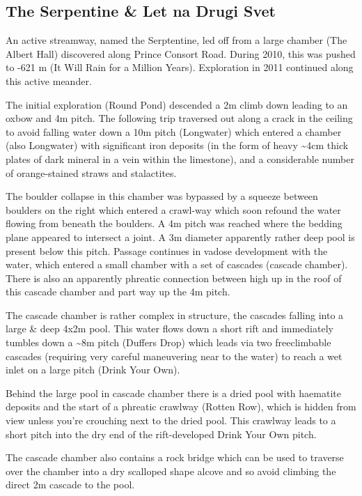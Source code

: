 \hypertarget{the-serpentine-let-na-drugi-svet}{%
\subsection{The Serpentine \& Let na Drugi
Svet}\label{the-serpentine-let-na-drugi-svet}}

An active streamway, named the Serptentine, led off from a large chamber
(The Albert Hall) discovered along Prince Consort Road. During 2010,
this was pushed to -621 m (It Will Rain for a Million Years).
Exploration in 2011 continued along this active meander.

The initial exploration (Round Pond) descended a 2m climb down leading
to an oxbow and 4m pitch. The following trip traversed out along a crack
in the ceiling to avoid falling water down a 10m pitch (Longwater) which
entered a chamber (also Longwater) with significant iron deposits (in
the form of heavy \textasciitilde{}4cm thick plates of dark mineral in a
vein within the limestone), and a considerable number of orange-stained
straws and stalactites.

The boulder collapse in this chamber was bypassed by a squeeze between
boulders on the right which entered a crawl-way which soon refound the
water flowing from beneath the boulders. A 4m pitch was reached where
the bedding plane appeared to intersect a joint. A 3m diameter
apparently rather deep pool is present below this pitch. Passage
continues in vadose development with the water, which entered a small
chamber with a set of cascades (cascade chamber). There is also an
apparently phreatic connection between high up in the roof of this
cascade chamber and part way up the 4m pitch.

The cascade chamber is rather complex in structure, the cascades falling
into a large \& deep 4x2m pool. This water flows down a short rift and
immediately tumbles down a \textasciitilde{}8m pitch (Duffers Drop)
which leads via two freeclimbable cascades (requiring very careful
maneuvering near to the water) to reach a wet inlet on a large pitch
(Drink Your Own).

Behind the large pool in cascade chamber there is a dried pool with
haematite deposits and the start of a phreatic crawlway (Rotten Row),
which is hidden from view unless you're crouching next to the dried
pool. This crawlway leads to a short pitch into the dry end of the
rift-developed Drink Your Own pitch.

The cascade chamber also contains a rock bridge which can be used to
traverse over the chamber into a dry scalloped shape alcove and so avoid
climbing the direct 2m cascade to the pool.

